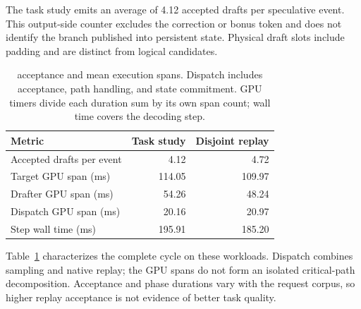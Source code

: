 The task study emits an average of 4.12 accepted drafts per \sys{} speculative event. This output-side counter excludes the correction or bonus token and does not identify the branch published into persistent state. Physical draft slots include padding and are distinct from logical candidates.

\begin{table}[t]
\caption{\sys{} acceptance and mean execution spans. Dispatch includes acceptance, path handling, and state commitment. GPU timers divide each duration sum by its own span count; wall time covers the decoding step.}
\label{tab:recovered-telemetry}
\centering\small
\begin{tabular}{@{}lrr@{}}
\toprule
Metric & Task study & Disjoint replay \\
\midrule
Accepted drafts per event & 4.12 & 4.72 \\
Target GPU span (ms) & 114.05 & 109.97 \\
Drafter GPU span (ms) & 54.26 & 48.24 \\
Dispatch GPU span (ms) & 20.16 & 20.97 \\
Step wall time (ms) & 195.91 & 185.20 \\
\bottomrule
\end{tabular}
\end{table}

Table~\ref{tab:recovered-telemetry} characterizes the complete \sys{} cycle on these workloads. Dispatch combines sampling and native replay; the GPU spans do not form an isolated critical-path decomposition. Acceptance and phase durations vary with the request corpus, so higher replay acceptance is not evidence of better task quality.
